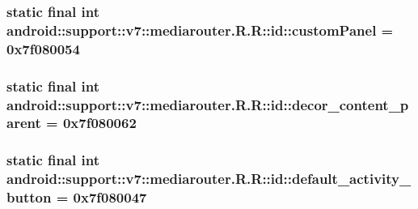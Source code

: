 \hypertarget{classandroid_1_1support_1_1v7_1_1mediarouter_1_1_r_1_1id_d47bd207b0260e03657b29e142a43ecc}{
\subsubsection[{customPanel}]{\setlength{\rightskip}{0pt plus 5cm}static final int android::support::v7::mediarouter.R.R::id::customPanel = 0x7f080054}}
\label{classandroid_1_1support_1_1v7_1_1mediarouter_1_1_r_1_1id_d47bd207b0260e03657b29e142a43ecc}


\hypertarget{classandroid_1_1support_1_1v7_1_1mediarouter_1_1_r_1_1id_85c2909cd150779836663a0167df9179}{
\subsubsection[{decor\_\-content\_\-parent}]{\setlength{\rightskip}{0pt plus 5cm}static final int android::support::v7::mediarouter.R.R::id::decor\_\-content\_\-parent = 0x7f080062}}
\label{classandroid_1_1support_1_1v7_1_1mediarouter_1_1_r_1_1id_85c2909cd150779836663a0167df9179}


\hypertarget{classandroid_1_1support_1_1v7_1_1mediarouter_1_1_r_1_1id_88680d3066b0379ab1948db5ea8225dc}{
\subsubsection[{default\_\-activity\_\-button}]{\setlength{\rightskip}{0pt plus 5cm}static final int android::support::v7::mediarouter.R.R::id::default\_\-activity\_\-button = 0x7f080047}}
\label{classandroid_1_1support_1_1v7_1_1mediarouter_1_1_r_1_1id_88680d3066b0379ab1948db5ea8225dc}


